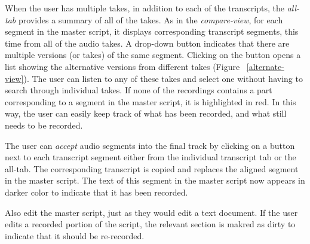 When the user has multiple takes, in addition to each of the transcripts, the \textit{all-tab} provides a summary of all of the takes. As in the \textit{compare-view}, for each segment in the master script, it displays corresponding transcript segments, this time from all of the audio takes. A drop-down button indicates that there are multiple versions (or takes) of the same segment. Clicking on the button opens a
list showing the alternative versions from different takes (Figure ~\ref{alternate-view}). The user can listen to any of these takes and select one without having to search through individual takes. If none of the recordings contains a part corresponding to a segment in the master script, it is highlighted in red. In this way, the user can easily keep track of what has been recorded, and what still needs to be recorded.  

The user can \textit{accept} audio segments into the final track by clicking on a button next to each transcript segment either from the individual transcript tab or the all-tab. The corresponding transcript is copied and replaces the aligned segment in the master script. The text of this segment in the master script now appears in darker color to indicate that it has been recorded. 

Also edit the master script, just as they would edit a text document. If the user edits a recorded portion of the script, the relevant section is makred as dirty to indicate that it should be re-recorded.

